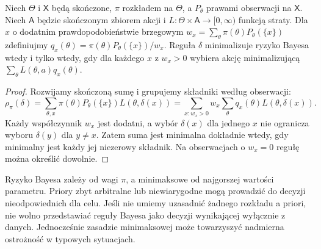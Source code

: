 \begin{stwierdzenie}
\label{prop:conditional-decision}
Niech $\Theta$ i $\mathsf X$ będą skończone, $\pi$ rozkładem na
$\Theta$, a $P_\theta$ prawami obserwacji na $\mathsf X$.
Niech $\mathsf A$ będzie skończonym zbiorem akcji i
$L:\Theta\times\mathsf A\to[0,\infty)$ funkcją straty.
Dla $x$ o dodatnim prawdopodobieństwie brzegowym
$w_x=\sum_{\theta}\pi(\theta)P_\theta(\{x\})$ zdefiniujmy
$q_x(\theta)=\pi(\theta)P_\theta(\{x\})/w_x$.
Reguła $\delta$ minimalizuje ryzyko Bayesa wtedy i tylko wtedy,
gdy dla każdego $x$ z $w_x>0$ wybiera akcję minimalizującą
$\sum_{\theta}L(\theta,a)q_x(\theta)$.
\end{stwierdzenie}
\begin{proof}
Rozwijamy skończoną sumę i grupujemy składniki według obserwacji:
\[
\rho_\pi(\delta)
=\sum_{\theta,x}\pi(\theta)P_\theta(\{x\})L(\theta,\delta(x))
=\sum_{x:w_x>0}w_x\sum_{\theta}q_x(\theta)L(\theta,\delta(x)).
\]
Każdy współczynnik $w_x$ jest dodatni, a wybór $\delta(x)$ dla
jednego $x$ nie ogranicza wyboru $\delta(y)$ dla $y\ne x$.
Zatem suma jest minimalna dokładnie wtedy, gdy minimalny jest każdy
jej niezerowy składnik. Na obserwacjach o $w_x=0$ regułę
można określić dowolnie.
\end{proof}

\begin{uwaga}
Ryzyko Bayesa zależy od wagi $\pi$, a minimaksowe od najgorszej
wartości parametru. Priory zbyt arbitralne lub niewiarygodne mogą
prowadzić do decyzji nieodpowiednich dla celu. Jeśli nie umiemy
uzasadnić żadnego rozkładu a priori, nie wolno przedstawiać
reguły Bayesa jako decyzji wynikającej wyłącznie z danych.
Jednocześnie zasadzie minimaksowej może towarzyszyć nadmierna
ostrożność w typowych sytuacjach.
\end{uwaga}

